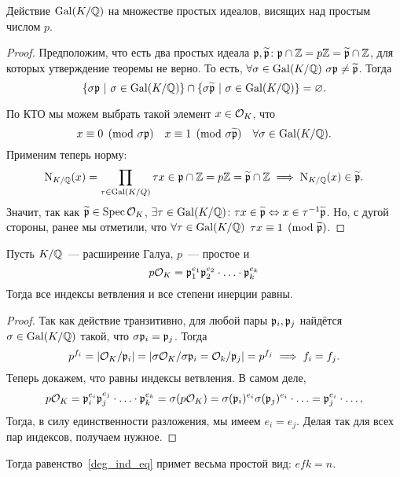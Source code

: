 	\begin{theorem} 
		Действие $\operatorname{Gal}(K/\mathbb{Q})$ на множестве простых идеалов, висящих над простым числом $p$.
	\end{theorem}
	\begin{proof}
		Предположим, что есть два простых идеала $\mathfrak{p}, \widetilde{\mathfrak{p}}\colon \mathfrak{p} \cap \mathbb{Z} = p\mathbb{Z} = \widetilde{\mathfrak{p}} \cap \mathbb{Z}$, для которых утверждение теоремы не верно. То есть, $\forall \sigma \in \operatorname{Gal}(K/\mathbb{Q}) \ \sigma \mathfrak{p} \neq \widetilde{\mathfrak{p}}$.    Тогда 
		\[
			\{ \sigma \mathfrak{p} \ \vert \ \sigma \in \operatorname{Gal}(K/\mathbb{Q}) \} \cap \{ \sigma \widetilde{\mathfrak{p}} \ \vert \ \sigma \in \operatorname{Gal}(K / \mathbb{Q}) \} = \varnothing.
		\]

		По КТО мы можем выбрать такой элемент $x \in \mathcal{O}_{K}$, что 
		\[
			x \equiv 0 \pmod{\sigma \mathfrak{p}} \quad x \equiv 1 \pmod{\sigma \widetilde{\mathfrak{p}}} \quad \forall \sigma \in \operatorname{Gal}(K/\mathbb{Q}).			
		\]
		Применим теперь норму: 
		\[
			\operatorname{\mathrm{N}}_{K/\mathbb{Q}}(x) = \prod_{\tau \in \operatorname{Gal}(K/Q)}\tau x \in \mathfrak{p} \cap \mathbb{Z} = p\mathbb{Z} = \widetilde{\mathfrak{p}} \cap \mathbb{Z} \implies \operatorname{\mathrm{N}}_{K/\mathbb{Q}}(x) \in \widetilde{\mathfrak{p}}. 
		\]
		Значит, так как $\widetilde{\mathfrak{p}} \in \operatorname{Spec}{\mathcal{O}_{K}}$, $\exists \tau \in \operatorname{Gal}(K/\mathbb{Q})\colon \tau x \in \widetilde{\mathfrak{p}} \Leftrightarrow x \in \tau^{-1}\widetilde{\mathfrak{p}}$. Но, с дугой стороны, ранее мы отметили, что $\forall \tau \in \operatorname{Gal}(K/\mathbb{Q})$ $\tau x \equiv 1 \pmod{\widetilde{\mathfrak{p}}}$.
	\end{proof}


	\begin{corollary}
		Пусть $K/\mathbb{Q}$~--- расширение Галуа, $p$~--- простое и 
		\[
			p \mathcal{O}_{K} = \mathfrak{p}_{1}^{e_1} \mathfrak{p}_{2}^{e_{2}} \cdot \ldots \cdot \mathfrak{p}_{k}^{e_k}
		\]
		Тогда все индексы ветвления и все степени инерции равны. 
	\end{corollary}
	\begin{proof}
		Так как действие транзитивно, для любой пары $\mathfrak{p}_i, \mathfrak{p}_j$ найдётся $\sigma \in \operatorname{Gal}(K/\mathbb{Q})$ такой, что $\sigma\mathfrak{p}_i = \mathfrak{p}_j$. Тогда 
		\[
			p^{f_i} = |\mathcal{O}_{K}/\mathfrak{p}_i| = |\sigma\mathcal{O}_{K}/\sigma \mathfrak{p}_i = \mathcal{O}_k/\mathfrak{p}_j| = p^{f_j} \implies f_i = f_j.
		\]
		Теперь докажем, что равны индексы ветвления. В самом деле, 
		\[
			p \mathcal{O}_{K} = \mathfrak{p}_{i}^{e_i} \mathfrak{p}_{j}^{e_{j}} \cdot \ldots \cdot \mathfrak{p}_{k}^{e_k} = \sigma(p\mathcal{O}_{K}) = \sigma(\mathfrak{p}_i)^{e_i} \sigma(\mathfrak{p}_{j})^{e_i} \cdot \ldots = \mathfrak{p}_j^{e_i} \cdot \ldots,
		\]
		Тогда, в силу единственности разложения, мы имеем $e_i = e_j$. Делая так для всех пар индексов, получаем нужное. 
	\end{proof}
	
	 Тогда равенство~\eqref{deg_ind_eq} примет весьма простой вид: $e f k = n$.\\


